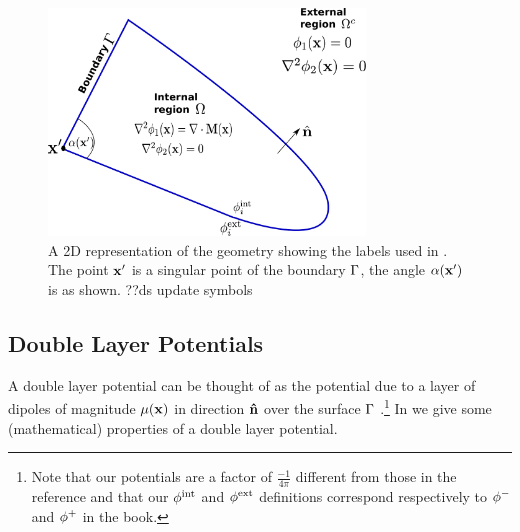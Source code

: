 \begin{figure}
  \center
  \includegraphics[width=0.75\textwidth]{./images/BEM-geometry}




  \caption{A 2D representation of the geometry showing the labels used in .
The point $\boldsymbol{\mathrm{x}}'$ is a singular point of the boundary ${\Gamma}$, the angle $\alpha(\boldsymbol{\mathrm{x}}')$ is as shown. ??ds update symbols}
  \label{fig:BEM-geometry}
\end{figure}

\subsection{Double Layer Potentials}
\label{sec:double-layer-potent}

A double layer potential can be thought of as the potential due to a layer of dipoles of magnitude $\mu(\boldsymbol{\mathrm{x}})$ in direction $\boldsymbol{\mathrm{\hat{n}}}$ over the surface ${\Gamma}$ \cite{Sternberg1946}.\footnote{Note that our potentials are a factor of $\frac{-1}{4 \pi}$ different from those in the reference and that our $\phi^{\mathrm{int}}$ and $\phi^{\mathrm{ext}}$ definitions correspond respectively to $\phi^-$ and $\phi^+$ in the book.}
In  we give some (mathematical) properties of a double layer potential.

